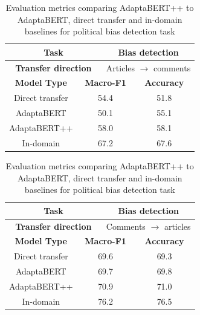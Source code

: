 \begin{table}[ht]
    \begin{center}
        \begin{tabular}{|c|c|c|c|c|c|}
            \hline
            \multicolumn{3}{|c|}{\textbf{Task}} & \multicolumn{3}{|c|}{Bias detection} \\
            \hline
            \multicolumn{3}{|c|}{\textbf{Transfer direction}} & \multicolumn{3}{|c|}{Articles $ \rightarrow $ comments} \\
            \hline \hline
            \multicolumn{2}{|c|}{\textbf{Model Type}} & \multicolumn{2}{|c|}{\textbf{Macro-F1}} & \multicolumn{2}{|c|}{\textbf{Accuracy}} \\
            \hline
            \multicolumn{2}{|c|}{Direct transfer} & \multicolumn{2}{|c|}{54.4} & \multicolumn{2}{|c|}{51.8} \\
            \multicolumn{2}{|c|}{AdaptaBERT} & \multicolumn{2}{|c|}{50.1} & \multicolumn{2}{|c|}{55.1} \\
            \multicolumn{2}{|c|}{AdaptaBERT++} & \multicolumn{2}{|c|}{58.0} & \multicolumn{2}{|c|}{58.1} \\
            \hline
            \multicolumn{2}{|c|}{In-domain} & \multicolumn{2}{|c|}{67.2} & \multicolumn{2}{|c|}{67.6} \\
            \hline
        \end{tabular}
    \end{center} \vspace{10pt}
    \begin{center}
        \begin{tabular}{|c|c|c|c|c|c|}
            \hline
            \multicolumn{3}{|c|}{\textbf{Task}} & \multicolumn{3}{|c|}{Bias detection} \\
            \hline
            \multicolumn{3}{|c|}{\textbf{Transfer direction}} & \multicolumn{3}{|c|}{Comments $ \rightarrow $ articles} \\
            \hline \hline
            \multicolumn{2}{|c|}{\textbf{Model Type}} & \multicolumn{2}{|c|}{\textbf{Macro-F1}} & \multicolumn{2}{|c|}{\textbf{Accuracy}} \\
            \hline
            \multicolumn{2}{|c|}{Direct transfer} & \multicolumn{2}{|c|}{69.6} & \multicolumn{2}{|c|}{69.3}  \\
            \multicolumn{2}{|c|}{AdaptaBERT} & \multicolumn{2}{|c|}{69.7} & \multicolumn{2}{|c|}{69.8} \\
            \multicolumn{2}{|c|}{AdaptaBERT++} & \multicolumn{2}{|c|}{70.9} & \multicolumn{2}{|c|}{71.0} \\
            \hline
            \multicolumn{2}{|c|}{In-domain} & \multicolumn{2}{|c|}{76.2} & \multicolumn{2}{|c|}{76.5}  \\
            \hline
        \end{tabular}
    \end{center}
    \caption{Evaluation metrics comparing AdaptaBERT++ to AdaptaBERT, direct transfer and in-domain baselines for political bias detection task}
    \label{tab:adaptabert-nsp-results}
\end{table}

